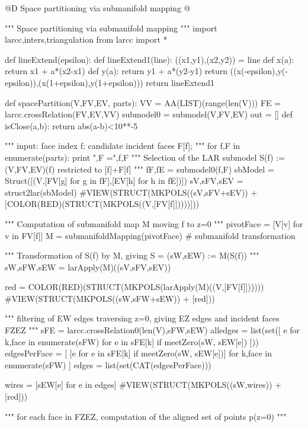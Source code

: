 \documentclass[11pt,oneside]{article}    %
\begin{document}
@D Space partitioning via submanifold mapping
@{""" Space partitioning via submanifold mapping """
import larcc,inters,triangulation
from larcc import *

def lineExtend(epsilon):
	def lineExtend1(line):
		((x1,y1),(x2,y2)) = line
		def x(a): return x1 + a*(x2-x1)
		def y(a): return y1 + a*(y2-y1)
		return ((x(-epsilon),y(-epsilon)),(x(1+epsilon),y(1+epsilon)))
	return lineExtend1

def spacePartition(V,FV,EV, parts):
    VV = AA(LIST)(range(len(V)))
    FE = larcc.crossRelation(FV,EV,VV)
    submodel0 = submodel(V,FV,EV)
    out = []
    def isClose(a,b): return abs(a-b)<10**-5
    
    """ input: face index f; candidate incident faces F[f]; """
    for f,F in enumerate(parts):
        print "\n\nf,F =",f,F
        """ Selection of the LAR submodel S(f) := (V,FV,EV)(f) restricted to [f]+F[f] """    
        fF,fE = submodel0(f,F)
        sbModel = Struct([(V,[FV[g] for g in fF],[EV[h] for h in fE])])
        sV,sFV,sEV = struct2lar(sbModel)
        #VIEW(STRUCT(MKPOLS((sV,sFV+sEV)) + [COLOR(RED)(STRUCT(MKPOLS((V,[FV[f]]))))]))
        
        """ Computation of submanifold map M moving f to z=0 """
        pivotFace = [V[v] for v in FV[f]]
        M = submanifoldMapping(pivotFace)  # submanifold transformation
        
        """ Transformation of S(f) by M, giving S = (sW,sEW) := M(S(f)) """
        sW,sFW,sEW = larApply(M)((sV,sFV,sEV))
        
        red = COLOR(RED)(STRUCT(MKPOLS(larApply(M)((V,[FV[f]])))))
        #VIEW(STRUCT(MKPOLS((sW,sFW+sEW)) + [red]))
        
        """ filtering of EW edges traversing z=0, giving EZ edges and incident faces FZEZ """
        sFE = larcc.crossRelation0(len(V),sFW,sEW)    
        alledges = list(set([ e for k,face in enumerate(sFW)  for e in sFE[k] 
                    if meetZero(sW, sEW[e]) ]))
        edgesPerFace = [ [e for e in sFE[k] if meetZero(sW, sEW[e])] 
                    for k,face in enumerate(sFW) ]
        edges = list(set(CAT(edgesPerFace)))
        
        wires = [sEW[e] for e in edges]
        #VIEW(STRUCT(MKPOLS((sW,wires)) + [red]))
        
        """ for each face in FZEZ, computation of the aligned set of points p(z=0) """
        
}
\end{document}
